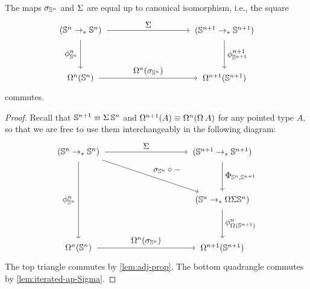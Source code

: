 \documentclass[english,a4paper]{lmcs}
\begin{document}
\begin{lem} \label{lem:sigma-susp}
  The maps $\sigma_{{\mathbb S^{n}}}$ and $\operatorname{\Sigma}$ are equal up to canonical isomorphism, i.e., the square
  \begin{equation} \label{eq:needs-to-commute}
    \begin{tikzpicture}[x=6cm,y=-2cm,baseline=(current bounding box.center)]
    \tikzset{arrow/.style={shorten >=0.1cm,shorten <=.1cm,->}}
    \node (A) at (0,0) {$(\Sn n \to_* \Sn n)$};
    \node (B) at (0,1) {$\Omega^n(\Sn n)$};
    \node (C) at (1,1) {$\Omega^{n+1}(\Sn {n+1})$};
    \node (D) at (1,0) {$(\Sn {n+1} \to_* \Sn {n+1})$};

    \draw[arrow] (A) to node [left] {$\phi_{\Sn n}^n$} (B);
    \draw[arrow] (B) to node [above] {$\Omega^n(\sigma_{\Sn n})$} (C);
    \draw[arrow] (D) to node [right] {$\phi_{\Sn {n+1}}^{n+1}$} (C);
    \draw[arrow] (A) to node [above] {$\susp$} (D);
    \end{tikzpicture}
  \end{equation}
  commutes.
\end{lem}
\begin{proof}%
  Recall that ${\mathbb S^{n+1}} \equiv \operatorname{\Sigma} {{\mathbb S^{n}}}$ and $\loopspace {n+1}(A) \jdeq
  \loopspace n (\loopspace\null A)$ for any pointed type $A$, so that we are
  free to use them interchangeably
  in the following diagram:
\begin{equation}
\begin{tikzpicture}[x=6cm,y=-2cm,baseline=(current bounding box.center)]
\tikzset{arrow/.style={shorten >=0.1cm,shorten <=.1cm,->}}
\node (A) at (0,0) {$(\Sn n \to_* \Sn n)$};
\node (B) at (0,2) {$\Omega^n(\Sn n)$};
\node (C) at (1,2) {$\Omega^{n+1}(\Sn {n+1})$};
\node (D) at (1,0) {$(\Sn {n+1} \to_* \Sn {n+1})$};
\node (E) at (1,1) {$(\Sn n \to_* \Omega \Sigma \Sn n)$};

\draw[arrow] (A) to node [left] {$\phi^n_{\Sn n}$} (B);
\draw[arrow] (B) to node [above] {$\loopspace n(\sigma_{\Sn n})$} (C);
\draw[arrow] (A) to node [above] {$\susp$} (D);
\draw[arrow] (D) to node [right] {$\Phi_{\Sn n,\Sn {n+1}}$} (E);
\draw[arrow] (E) to node [right] {$\phi^n_{\loopspace\null(\Sn {n+1})}$} (C);
\draw[arrow] (A) to node [above right] {$\sigma_{\Sn n} \circ \blank$} (E);
\end{tikzpicture}
\end{equation}
The top triangle commutes by \cref{lem:adj-prop}.
The bottom quadrangle commutes by \cref{lem:iterated-ap-Sigma}.
\end{proof}
\end{document}
